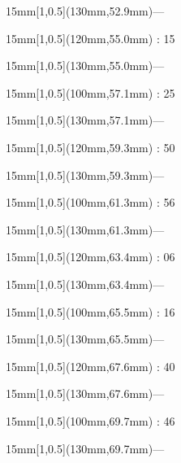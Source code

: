\documentclass[a4paper]{memoir}
\begin{document}
\begin{textblock*}{15mm}[1,0.5](130mm,52.9mm)\flushright —\end{textblock*}
\begin{textblock*}{15mm}[1,0.5](120mm,55.0mm) : 15\end{textblock*}
\begin{textblock*}{15mm}[1,0.5](130mm,55.0mm)\flushright —\end{textblock*}
\begin{textblock*}{15mm}[1,0.5](100mm,57.1mm) : 25\end{textblock*}
\begin{textblock*}{15mm}[1,0.5](130mm,57.1mm)\flushright —\end{textblock*}
\begin{textblock*}{15mm}[1,0.5](120mm,59.3mm) : 50\end{textblock*}
\begin{textblock*}{15mm}[1,0.5](130mm,59.3mm)\flushright —\end{textblock*}
\begin{textblock*}{15mm}[1,0.5](100mm,61.3mm) : 56\end{textblock*}
\begin{textblock*}{15mm}[1,0.5](130mm,61.3mm)\flushright —\end{textblock*}
\begin{textblock*}{15mm}[1,0.5](120mm,63.4mm) : 06\end{textblock*}
\begin{textblock*}{15mm}[1,0.5](130mm,63.4mm)\flushright —\end{textblock*}
\begin{textblock*}{15mm}[1,0.5](100mm,65.5mm) : 16\end{textblock*}
\begin{textblock*}{15mm}[1,0.5](130mm,65.5mm)\flushright —\end{textblock*}
\begin{textblock*}{15mm}[1,0.5](120mm,67.6mm) : 40\end{textblock*}
\begin{textblock*}{15mm}[1,0.5](130mm,67.6mm)\flushright —\end{textblock*}
\begin{textblock*}{15mm}[1,0.5](100mm,69.7mm) : 46\end{textblock*}
\begin{textblock*}{15mm}[1,0.5](130mm,69.7mm)\flushright —\end{textblock*}
\end{document}
